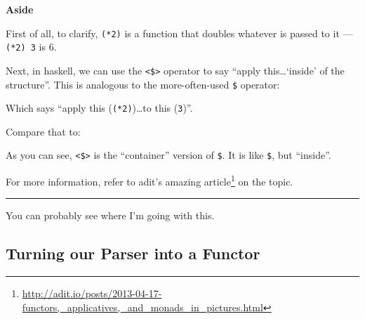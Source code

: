 \documentclass[]{article}
\newenvironment{Shaded}{}{}
\newcommand{\DataTypeTok}[1]{\textcolor[rgb]{0.56,0.13,0.00}{#1}}
\newcommand{\DecValTok}[1]{\textcolor[rgb]{0.25,0.63,0.44}{#1}}
\newcommand{\FunctionTok}[1]{\textcolor[rgb]{0.02,0.16,0.49}{#1}}
\newcommand{\NormalTok}[1]{#1}
\renewcommand{\href}[2]{#2\footnote{\url{#1}}}
\begin{document}
\textbf{Aside}

First of all, to clarify, \texttt{(*2)} is a function that doubles whatever is
passed to it --- \texttt{(*2)\ 3} is 6.

Next, in haskell, we can use the \texttt{\textless{}\$\textgreater{}} operator
to say ``apply this\ldots{}`inside' of the structure''. This is analogous to the
more-often-used \texttt{\$} operator:

\begin{Shaded}
\end{Shaded}

Which says ``apply this (\texttt{(*2)})\ldots{}to this (\texttt{3})''.

Compare that to:

\begin{Shaded}
\end{Shaded}

As you can see, \texttt{\textless{}\$\textgreater{}} is the ``container''
version of \texttt{\$}. It is like \texttt{\$}, but ``inside''.

For more information, refer to adit's
\href{http://adit.io/posts/2013-04-17-functors,_applicatives,_and_monads_in_pictures.html}{amazing
article} on the topic.

\begin{center}\rule{0.5\linewidth}{\linethickness}\end{center}

You can probably see where I'm going with this.

\hypertarget{turning-our-parser-into-a-functor}{%
\subsection{Turning our Parser into a
Functor}\label{turning-our-parser-into-a-functor}}
\end{document}
